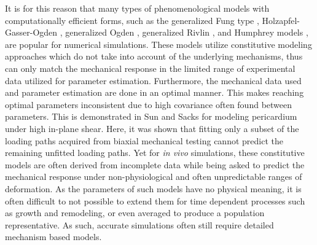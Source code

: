     It is for this reason that many types of phenomenological models with computationally efficient forms, such as the generalized Fung type \cite{fung_biomechanics_1993}, Holzapfel-Gasser-Ogden \cite{holzapfel_new_2000}, generalized Ogden \cite{ogden_large_1972}, generalized Rivlin \cite{rivlin_large_1951}, and Humphrey models \cite{may-newman_constitutive_1998}, are popular for numerical simulations. These models utilize constitutive modeling approaches which do not take into account of the underlying mechanisms, thus can only match the mechanical response in the limited range of experimental data utilized for parameter estimation. Furthermore, the mechanical data used and parameter estimation are done in an optimal manner. This makes reaching optimal parameters inconsistent due to high covariance often found between parameters. This is demonstrated in Sun and Sacks \cite{sun_biaxial_2003} for modeling pericardium under high in-plane shear. Here, it was shown that fitting only a subset of the loading paths acquired from biaxial mechanical testing cannot predict the remaining unfitted loading paths. Yet for \textit{in vivo} simulations, these constitutive models are often derived from incomplete data while being asked to predict the mechanical response under non-physiological and often unpredictable ranges of deformation. As the parameters of such models have no physical meaning, it is often difficult to not possible to extend them for time dependent processes such as growth and remodeling, or even averaged to produce a population representative. As such, accurate simulations often still require detailed mechanism based models. 
    

